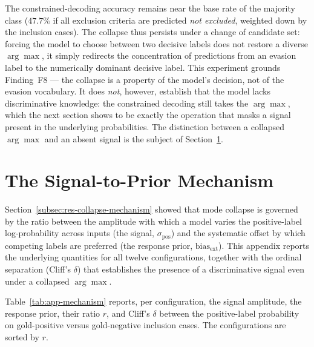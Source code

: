 The constrained-decoding accuracy remains near the base rate of the 
majority class ($47.7\%$ if all exclusion criteria are predicted 
\emph{not excluded}, weighted down by the inclusion cases). The 
collapse thus persists under a change of candidate set: forcing the 
model to choose between two decisive labels does not restore a diverse 
$\arg\max$, it simply redirects the concentration of predictions from an 
evasion label to the numerically dominant decisive label. This 
experiment grounds Finding~F8 --- the collapse is a property of the 
model's decision, not of the evasion vocabulary. It does \emph{not}, 
however, establish that the model lacks discriminative knowledge: the 
constrained decoding still takes the $\arg\max$, which the next section 
shows to be exactly the operation that masks a signal present in the 
underlying probabilities. The distinction between a collapsed $\arg\max$ 
and an absent signal is the subject of 
Section~\ref{sec:app-mechanism}.

\section{The Signal-to-Prior Mechanism}
\label{sec:app-mechanism}

Section~\ref{subsec:res-collapse-mechanism} showed that mode collapse is 
governed by the ratio between the amplitude with which a model varies the 
positive-label log-probability across inputs (the signal, 
$\sigma_{\text{pos}}$) and the systematic offset by which competing 
labels are preferred (the response prior, $\text{bias}_{\text{ext}}$). 
This appendix reports the underlying quantities for all twelve 
configurations, together with the ordinal separation (Cliff's $\delta$) 
that establishes the presence of a discriminative signal even under a 
collapsed $\arg\max$.

Table~\ref{tab:app-mechanism} reports, per configuration, the signal 
amplitude, the response prior, their ratio $r$, and Cliff's $\delta$ 
between the positive-label probability on gold-positive versus 
gold-negative inclusion cases. The configurations are sorted by $r$.

